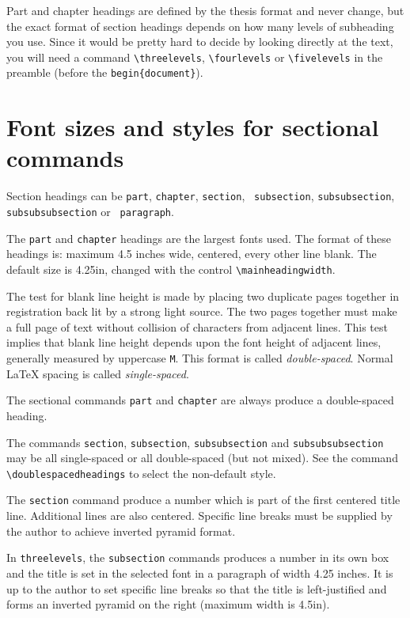 Part and chapter headings are defined by the thesis format and never
change, but the exact format of section headings depends
on how many levels of subheading you use.
Since it would be pretty hard to decide by looking
directly at the text, you will need a command \verb|\threelevels|,
\verb|\fourlevels| or \verb"\fivelevels" in the preamble (before the
\verb|begin{document}|).

\section{Font sizes and styles for sectional commands}

Section headings can be {\tt part}, {\tt chapter}, {\tt section}, {\tt
subsection}, {\tt subsubsection}, {\tt subsubsubsection} or {\tt
paragraph}.

The {\tt part} and {\tt chapter} headings are the largest fonts used.
The format of these headings is: maximum 4.5 inches wide, centered,
every other line blank. The default size is 4.25in, changed with the
control \verb"\mainheadingwidth".

The test for blank line height is made by placing two duplicate pages
together in registration back lit by a strong light source. The two pages
together must make a full page of text without collision of characters
from adjacent lines. This test implies that blank line height depends
upon the font height of adjacent lines, generally measured by
uppercase {\tt M}. This format is called {\em double-spaced}. Normal
\LaTeX{} spacing is called {\em single-spaced}.

The sectional commands {\tt part} and {\tt chapter} are always produce a
double-spaced heading.

The commands {\tt section}, {\tt subsection}, {\tt subsubsection} and
{\tt subsubsubsection} may be all single-spaced or all double-spaced
(but not mixed). See the command \verb"\doublespacedheadings" to select
the non-default style.

The {\tt section} command produce a number which is part of the first
centered title line. Additional lines are also centered. Specific line
breaks must be supplied by the author to achieve inverted pyramid
format.

In {\tt threelevels},
the {\tt subsection} commands produces a number
in its own box and the title is set in the selected font in a paragraph
of width 4.25 inches. It is up to the author to set specific line breaks
so that the title is left-justified and forms an inverted pyramid on the
right (maximum width is 4.5in).

